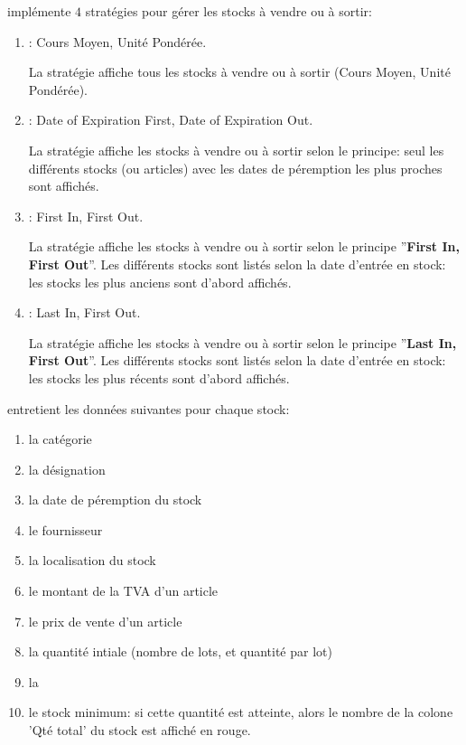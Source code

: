 \yeren impl\'emente $4$ strat\'egies pour g\'erer les stocks \`a
vendre ou \`a sortir:
\begin{enumerate}[1)]
	\item \cmup: Cours Moyen, Unit\'e Pond\'er\'ee.
	
		La strat\'egie \cmup affiche tous les 
		stocks \`a vendre ou \`a sortir (Cours
		Moyen, Unit\'e Pond\'er\'ee).\\
		
	\item \dpfdpo: Date of Expiration First, Date of Expiration Out.
	
		La strat\'egie \dpfdpo affiche les
		stocks \`a vendre ou \`a sortir selon
		le principe: seul les diff\'erents
		stocks (ou articles) avec les dates
		de p\'eremption les plus proches sont affich\'es.\\
		
	\item \fifo: First In, First Out. 
	
		La strat\'egie \fifo affiche les stocks
		\`a vendre ou \`a sortir selon le principe
		''\textbf{First In, First Out}''.
		Les diff\'erents stocks sont list\'es
		selon la date d'entr\'ee en stock:
		les stocks les plus anciens sont d'abord affich\'es.\\
		
	\item \lifo: Last In, First Out.
	
		La strat\'egie \lifo affiche les stocks
		\`a vendre ou \`a sortir selon le principe
		''\textbf{Last In, First Out}''. Les diff\'erents 
		stocks sont list\'es selon la date
		d'entr\'ee en stock: les stocks les plus
		r\'ecents sont d'abord affich\'es.\\
\end{enumerate}
\index{\cmup}
\index{\dpfdpo}
\index{\fifo}
\index{\lifo}




\yeren entretient les donn\'ees suivantes pour chaque stock:
\begin{enumerate}[1)]
	\item la cat\'egorie \obligatoire
	\item la d\'esignation \obligatoire
	\item la date de p\'eremption du stock 
	\item le fournisseur 
	\item la localisation du stock
	\item le montant de la TVA d'un article 
	\item le prix de vente d'un article \obligatoire
	\item la quantit\'e intiale (nombre de lots, et quantit\'e par lot) \obligatoire
	\item la 
	\item le stock minimum: si cette quantit\'e
		est atteinte, alors le nombre de la colone 'Qt\'e total'
		du stock est affich\'e en rouge.\\
\end{enumerate}

